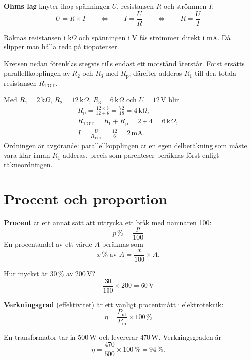 \textbf{Ohms lag} knyter ihop spänningen $U$, resistansen $R$ och strömmen $I$:
\[
  U = R \times I
  \qquad \Leftrightarrow \qquad
  I = \frac{U}{R}
  \qquad \Leftrightarrow \qquad
  R = \frac{U}{I}
\]

\begin{aside}
\note[Tips] Räknas resistansen i k$\Omega$ och spänningen i V fås strömmen direkt i mA. Då slipper
man hålla reda på tiopotenser.
\end{aside}

\begin{exempel}
Kretsen nedan förenklas stegvis tills endast ett motstånd återstår. Först ersätts
parallellkopplingen av $R_2$ och $R_3$ med $R_{\text{p}}$, därefter adderas $R_1$ till den totala
resistansen $R_{\text{TOT}}$.


Med $R_1 = 2\,\text{k}\Omega$, $R_2 = 12\,\text{k}\Omega$, $R_3 = 6\,\text{k}\Omega$ och
$U = 12\,\text{V}$ blir
\begin{gather*}
  R_{\text{p}} = \frac{12 \times 6}{12 + 6} = \frac{72}{18} = 4\,\text{k}\Omega, \\
  R_{\text{TOT}} = R_1 + R_{\text{p}} = 2 + 4 = 6\,\text{k}\Omega, \\
  I = \frac{U}{R_{\text{TOT}}} = \frac{12}{6} = 2\,\text{mA}.
\end{gather*}
Ordningen är avgörande: parallellkopplingen är en egen delberäkning som måste vara klar innan
$R_1$ adderas, precis som parenteser beräknas först enligt räkneordningen.
\end{exempel}

\section{Procent och proportion}
\label{c1:sec:procent}
\textbf{Procent} är ett annat sätt att uttrycka ett bråk med nämnaren 100:
\[
  p\,\% = \frac{p}{100}
\]
En procentandel av ett värde $A$ beräknas som
\[
  x\,\% \text{ av } A = \frac{x}{100} \times A.
\]

\begin{exempel}
Hur mycket är $30\,\%$ av $200\,\text{V}$?
\[
  \frac{30}{100} \times 200 = 60\,\text{V}
\]
\end{exempel}

\textbf{Verkningsgrad} (effektivitet) är ett vanligt procentmått i elektroteknik:
\[
  \eta = \frac{P_{\text{ut}}}{P_{\text{in}}} \times 100\,\%
\]

\begin{exempel}
En transformator tar in $500\,\text{W}$ och levererar $470\,\text{W}$. Verkningsgraden är
\[
  \eta = \frac{470}{500} \times 100\,\% = 94\,\%.
\]
\end{exempel}
